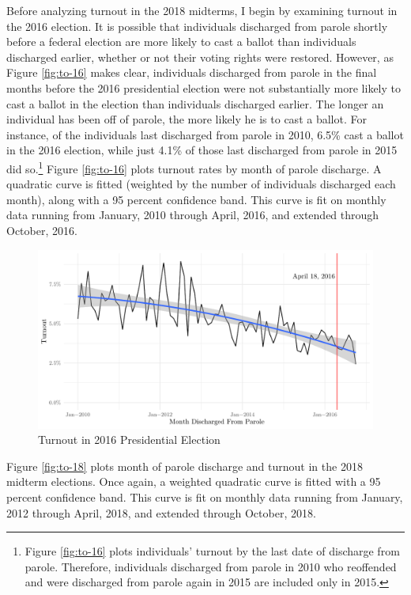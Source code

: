 \documentclass[]{article}
\let\rmarkdownfootnote\footnote%
\def\footnote{\protect\rmarkdownfootnote}
\begin{document}
Before analyzing turnout in the 2018 midterms, I begin by examining turnout in the 2016 election. It is possible that individuals discharged from parole shortly before a federal election are more likely to cast a ballot than individuals discharged earlier, whether or not their voting rights were restored. However, as Figure \ref{fig:to-16} makes clear, individuals discharged from parole in the final months before the 2016 presidential election were not substantially more likely to cast a ballot in the election than individuals discharged earlier. The longer an individual has been off of parole, the more likely he is to cast a ballot. For instance, of the individuals last discharged from parole in 2010, 6.5\% cast a ballot in the 2016 election, while just 4.1\% of those last discharged from parole in 2015 did so.\footnote{Figure \ref{fig:to-16} plots individuals' turnout by the last date of discharge from parole. Therefore, individuals discharged from parole in 2010 who reoffended and were discharged from parole again in 2015 are included only in 2015.} Figure \ref{fig:to-16} plots turnout rates by month of parole discharge. A quadratic curve is fitted (weighted by the number of individuals discharged each month), along with a 95 percent confidence band. This curve is fit on monthly data running from January, 2010 through April, 2016, and extended through October, 2016.

\begin{figure}[H]

{\centering \includegraphics{felony_disenfranchisement_nys_files/figure-latex/to-16-chart-1} 

}

\caption{\label{fig:to-16}Turnout in 2016 Presidential Election}\label{fig:to-16-chart}
\end{figure}

Figure \ref{fig:to-18} plots month of parole discharge and turnout in the 2018 midterm elections. Once again, a weighted quadratic curve is fitted with a 95 percent confidence band. This curve is fit on monthly data running from January, 2012 through April, 2018, and extended through October, 2018.
\end{document}
